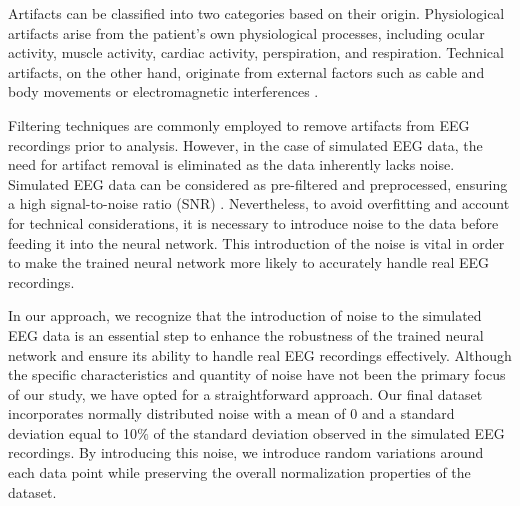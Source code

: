 \documentclass[a4paper, UKenglish, 11pt]{uiomaster}
\begin{document}
Artifacts can be classified into two categories based on their origin. Physiological artifacts arise from the patient's own physiological processes, including ocular activity, muscle activity, cardiac activity, perspiration, and respiration. Technical artifacts, on the other hand, originate from external factors such as cable and body movements or electromagnetic interferences \cite{bitbrain}.

Filtering techniques are commonly employed to remove artifacts from EEG recordings prior to analysis. However, in the case of simulated EEG data, the need for artifact removal is eliminated as the data inherently lacks noise. Simulated EEG data can be considered as pre-filtered and preprocessed, ensuring a high signal-to-noise ratio (SNR) \cite{wiki-snr}. Nevertheless, to avoid overfitting and account for technical considerations, it is necessary to introduce noise to the data before feeding it into the neural network. This introduction of the noise is vital in order to make the trained neural network more likely to accurately handle real EEG recordings.

In our approach, we recognize that the introduction of noise to the simulated EEG data is an essential step to enhance the robustness of the trained neural network and ensure its ability to handle real EEG recordings effectively. Although the specific characteristics and quantity of noise have not been the primary focus of our study, we have opted for a straightforward approach. Our final dataset incorporates normally distributed noise with a mean of 0 and a standard deviation equal to 10$\%$ of the standard deviation observed in the simulated EEG recordings. By introducing this noise, we introduce random variations around each data point while preserving the overall normalization properties of the dataset.
\end{document}
